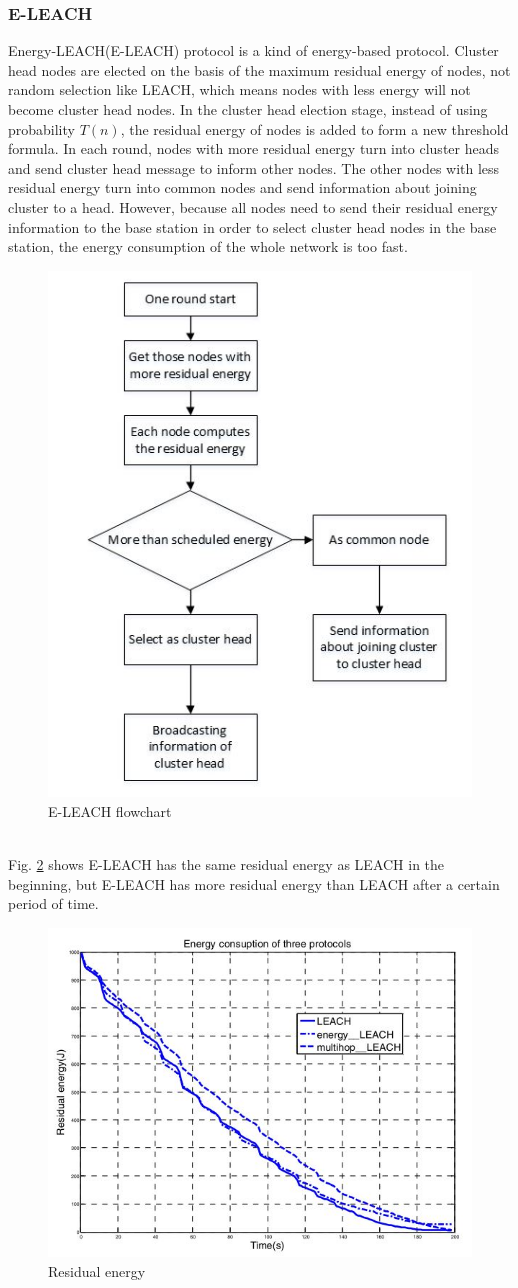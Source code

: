 \documentclass[11pt]{report}
\begin{document}
	\subsubsection{E-LEACH}
	Energy-LEACH(E-LEACH) protocol \cite{4394931} is a kind of energy-based protocol. Cluster head nodes are elected on the basis of the maximum residual energy of nodes, not random selection like LEACH, which means nodes with less energy will not become cluster head nodes. In the cluster head election stage, instead of using probability $T(n)$, the residual energy of nodes is added to form a new threshold formula. In each round, nodes with more residual energy turn into cluster heads and send cluster head message to inform other nodes. The other nodes with less residual energy turn into common nodes and send information about joining cluster to a head. However, because all nodes need to send their residual energy information to the base station in order to select cluster head nodes in the base station, the energy consumption of the whole network is too fast. 
	\begin{figure}[h!]
		\centering
		\includegraphics[width=0.5\linewidth]{eleachflowchart.jpg}
		\caption{E-LEACH flowchart}
		\label{}
	\end{figure}\\
	Fig. \ref {residualenergy} shows E-LEACH has the same residual energy as LEACH in the beginning, but E-LEACH has more residual energy than LEACH after a certain period of time.  
	\begin{figure}[h!]
		\centering
		\includegraphics[width=0.5\linewidth]{eleach.jpg}
		\caption{Residual energy}
		\label{residualenergy}
	\end{figure}
\end{document}
